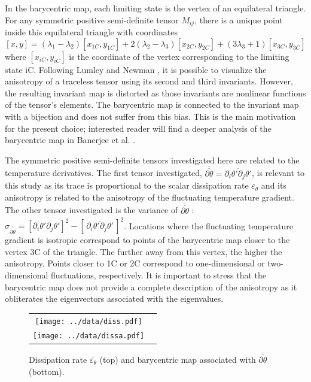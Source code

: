 \documentclass[review]{elsarticle}
\newcommand{\epst}{\varepsilon_\theta}
\begin{document}
In the barycentric map, each limiting state is the vertex of an equilateral triangle. For any symmetric positive semi-definite tensor $M_{ij}$, there is a unique point inside this equilateral triangle with coordinates
\begin{equation}
\left[ x,y \right] = \left( \lambda_1 - \lambda_2 \right) \left[ x_{1C},y_{1C} \right] + 2 \left( \lambda_2 - \lambda_3 \right) \left[ x_{2C},y_{2C} \right] + \left( 3\lambda_3 + 1 \right) \left[ x_{3C},y_{3C} \right]
\end{equation}
where $\left[x_{iC},y_{iC} \right]$ is the coordinate of the vertex corresponding to the limiting state iC. Following Lumley and Newman \cite{lumley1977return}, it is possible to visualize the anisotropy of a traceless tensor using its second and third invariants. However, the resulting invariant map is distorted as those invariants are nonlinear functions of the tensor’s elements. The barycentric map is connected to the invariant map with a bijection and does not suffer from this bias. This is the main motivation for the present choice; interested reader will find a deeper analysis of the barycentric map in Banerjee et al. \citep{banerjee2007presentation}.

The symmetric positive semi-definite tensors investigated here are related to the temperature derivatives. The first tensor investigated, $\overline{\overline{\partial \theta}} = \overline{\partial_i \theta' \partial_j \theta' }$, is relevant to this study as its trace is proportional to the scalar dissipation rate $\epst$ and its anisotropy is related to the anisotropy of the fluctuating temperature gradient. The other tensor investigated is the variance of $\overline{\overline{\partial \theta}}$ : $\sigma_{\overline{\overline{\partial \theta}}} = \overline{\left[\partial_i \theta' \partial_j \theta' \right]^2 } - \left[ \, \overline{\partial_i \theta' \partial_j \theta' } \, \right]^2$. Locations where the fluctuating temperature gradient is isotropic correspond to points of the barycentric map closer to the vertex 3C of the triangle. The further away from this vertex, the higher the anisotropy. Points closer to 1C or 2C correspond to one-dimensional or two-dimensional fluctuations, respectively. It is important to stress that the barycentric map does not provide a complete description of the anisotropy as it obliterates the eigenvectors associated with the eigenvalues.

\begin{figure}[htbp]
\begin{center}
\begin{tabular}{cc}
\texttt{[image: ../data/diss.pdf]} \\
\texttt{[image: ../data/dissa.pdf]}
\end{tabular}
\end{center}
\caption{Dissipation rate $\overline{\epst}$ (top) and barycentric map associated with $\overline{\overline{\partial \theta}}$ (bottom).}
\label{fig-diss}
\end{figure}
\end{document}
